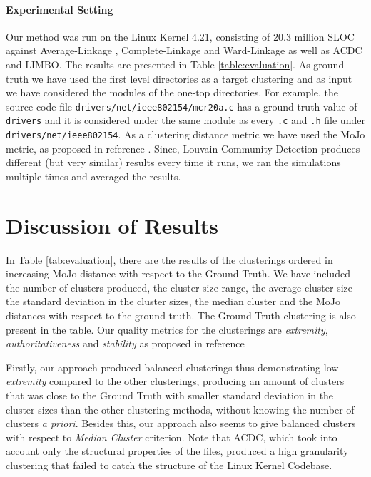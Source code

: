 \documentclass[sigconf,review, anonymous]{acmart}
\begin{document}
\paragraph{Experimental Setting} Our method was run on the Linux Kernel 4.21,
 consisting of 20.3 million SLOC against Average-Linkage \cite{average}, Complete-Linkage \cite{complete} and Ward-Linkage \cite{ward} as well as ACDC and LIMBO. The results are presented in Table \ref{table:evaluation}. As ground truth we have used the first level directories as a target clustering and as input we have considered the modules of the one-top directories. For example, the source code file \texttt{drivers/net/ieee802154/mcr20a.c} has a ground truth value of \texttt{drivers} and it is considered under the same module as every \texttt{.c} and \texttt{.h} file under \texttt{drivers/net/ieee802154}. As a clustering distance metric we have used the MoJo metric, as proposed in reference \cite{mojo}. Since, Louvain Community Detection produces 
 different (but very similar) results every time it runs, we ran the simulations multiple times and averaged the results. 

\section{Discussion of Results}

 In Table \ref{tab:evaluation}, there are the results of the clusterings ordered in increasing MoJo distance with respect to the Ground Truth. We have included the number of clusters produced, the cluster size range, the average cluster size the standard deviation in the cluster sizes, the median cluster and the MoJo distances with respect to the ground truth. The Ground Truth clustering is also present in the table. Our quality metrics for the clusterings are 
\emph{extremity}, \emph{authoritativeness} and \emph{stability} as proposed in reference \cite{evaluation}

Firstly, our approach produced balanced clusterings thus demonstrating low \emph{extremity} compared to the other clusterings, producing an amount of clusters that was close to the Ground Truth with smaller standard deviation in the cluster sizes than the other clustering methods, without knowing the number of clusters \emph{a priori}. Besides this, our approach also seems to give balanced clusters with respect to \emph{Median Cluster} criterion. Note that ACDC, which took into account only the structural properties of the files, produced a high granularity clustering that failed to catch the structure of the Linux Kernel Codebase. 
\end{document}
